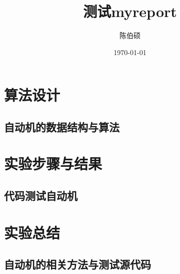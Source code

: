 \documentclass[pdfCover]{myreport} %
\title{测试myreport}
\author{陈伯硕}
\date{\today}
\begin{document}
\maketitle
\pagestyle{empty}

\setcounter{section}{3}
\section{算法设计}
  \subsection{自动机的数据结构与算法}
    
\section{实验步骤与结果}
  \subsection{代码测试自动机}
    



\section{实验总结}




\nocite{alfred_v_aho_compilers_2006}
\nocite{automata-from-regex}

\begin{appendices}
  \section{自动机的相关方法与测试源代码}
    
\end{appendices}
\end{document}
